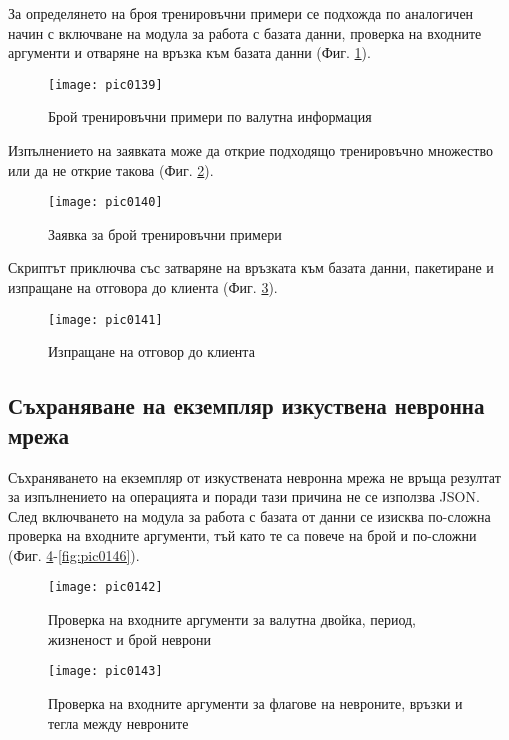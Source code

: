 За определянето на броя тренировъчни примери се подхожда по аналогичен начин с включване на модула за работа с базата данни, проверка на входните аргументи и отваряне на връзка към базата данни (Фиг. \ref{fig:pic0139}). 

\begin{figure}[h]
  \centering
  \texttt{[image: pic0139]}
  \caption{Брой тренировъчни примери по валутна информация}
\label{fig:pic0139}
\end{figure}
\FloatBarrier

Изпълнението на заявката може да открие подходящо тренировъчно множество или да не открие такова (Фиг. \ref{fig:pic0140}). 

\begin{figure}[h]
  \centering
  \texttt{[image: pic0140]}
  \caption{Заявка за брой тренировъчни примери}
\label{fig:pic0140}
\end{figure}
\FloatBarrier

Скриптът приключва със затваряне на връзката към базата данни, пакетиране и изпращане на отговора до клиента (Фиг. \ref{fig:pic0141}).

\begin{figure}[h]
  \centering
  \texttt{[image: pic0141]}
  \caption{Изпращане на отговор до клиента}
\label{fig:pic0141}
\end{figure}
\FloatBarrier

\subsection{Съхраняване на екземпляр изкуствена невронна мрежа}

Съхраняването на екземпляр от изкуствената невронна мрежа не връща резултат за изпълнението на операцията и поради тази причина не се използва JSON. След включването на модула за работа с базата от данни се изисква по-сложна проверка на входните аргументи, тъй като те са повече на брой и по-сложни (Фиг. \ref{fig:pic0142}-\ref{fig:pic0146}). 

\begin{figure}[h]
  \centering
  \texttt{[image: pic0142]}
  \caption{Проверка на входните аргументи за валутна двойка, период, жизненост и брой неврони}
\label{fig:pic0142}
\end{figure}
\FloatBarrier

\begin{figure}[h]
  \centering
  \texttt{[image: pic0143]}
  \caption{Проверка на входните аргументи за флагове на невроните, връзки и тегла между невроните}
\label{fig:pic0143}
\end{figure}
\FloatBarrier

